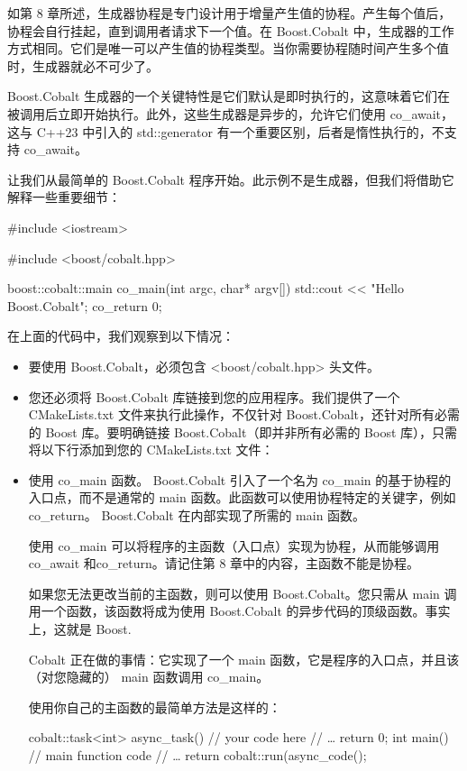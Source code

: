 
如第 8 章所述，生成器协程是专门设计用于增量产生值的协程。产生每个值后，协程会自行挂起，直到调用者请求下一个值。在 Boost.Cobalt 中，生成器的工作方式相同。它们是唯一可以产生值的协程类型。当你需要协程随时间产生多个值时，生成器就必不可少了。

Boost.Cobalt 生成器的一个关键特性是它们默认是即时执行的，这意味着它们在被调用后立即开始执行。此外，这些生成器是异步的，允许它们使用 co\_await，这与 C++23 中引入的 std::generator 有一个重要区别，后者是惰性执行的，不支持 co\_await。


让我们从最简单的 Boost.Cobalt 程序开始。此示例不是生成器，但我们将借助它解释一些重要细节：

\begin{cpp}
#include <iostream>

#include <boost/cobalt.hpp>

boost::cobalt::main co_main(int argc, char* argv[]) {
    std::cout << "Hello Boost.Cobalt\n";
    co_return 0;
}
\end{cpp}

在上面的代码中，我们观察到以下情况：

\begin{itemize}
\item
要使用 Boost.Cobalt，必须包含 <boost/cobalt.hpp> 头文件。

\item
您还必须将 Boost.Cobalt 库链接到您的应用程序。我们提供了一个 CMakeLists.txt 文件来执行此操作，不仅针对 Boost.Cobalt，还针对所有必需的 Boost 库。要明确链接 Boost.Cobalt（即并非所有必需的 Boost 库），只需将以下行添加到您的 CMakeLists.txt 文件：


\item
使用 co\_main 函数。 Boost.Cobalt 引入了一个名为 co\_main 的基于协程的入口点，而不是通常的 main 函数。此函数可以使用协程特定的关键字，例如 co\_return。 Boost.Cobalt 在内部实现了所需的 main 函数。

使用 co\_main 可以将程序的主函数（入口点）实现为协程，从而能够调用 co\_await 和co\_return。请记住第 8 章中的内容，主函数不能是协程。

如果您无法更改当前的主函数，则可以使用 Boost.Cobalt。您只需从 main 调用一个函数，该函数将成为使用 Boost.Cobalt 的异步代码的顶级函数。事实上，这就是 Boost.

Cobalt 正在做的事情：它实现了一个 main 函数，它是程序的入口点，并且该（对您隐藏的） main 函数调用 co\_main。

使用你自己的主函数的最简单方法是这样的：

\begin{cpp}
cobalt::task<int> async_task() {
    // your code here
    // …
    return 0;
}
int main() {
    // main function code
    // …
    return cobalt::run(async_code();
}
\end{cpp}
\end{itemize}

